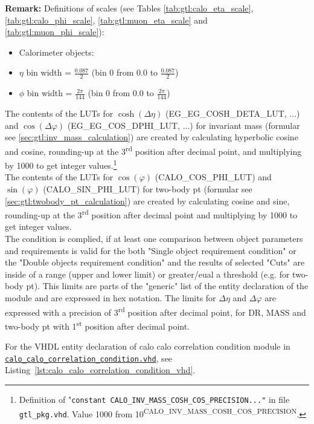 \textbf{Remark:} Definitions of scales (see Tables \ref{tab:gtl:calo_eta_scale}, \ref{tab:gtl:calo_phi_scale}, \ref{tab:gtl:muon_eta_scale} and \ref{tab:gtl:muon_phi_scale}):
\begin{itemize}
\item Calorimeter objects:
\item $\eta$ bin width = $\frac{0.087}{2}$ (bin 0 from 0.0 to $\frac{0.087}{2}$)
\item $\phi$ bin width = $\frac{2\pi}{144}$ (bin 0 from 0.0 to $\frac{2\pi}{144}$)
\end{itemize}

The contents of the LUTs for $\cosh(\Delta\eta)$ (\small{EG\_EG\_COSH\_DETA\_LUT}\normalsize, ...) and $\cos(\Delta\varphi)$ (\small{EG\_EG\_COS\_DPHI\_LUT}\normalsize, ...) for invariant mass (formular see \ref{sec:gtl:inv_mass_calculation}) are created by calculating hyperbolic cosine and cosine, rounding-up at the 3\textsuperscript{rd} position after decimal point, and multiplying by 1000 to get integer values.\footnote{Definition of "\texttt{constant \small{CALO\_INV\_MASS\_COSH\_COS\_PRECISION}\normalsize ..."} in file \texttt{gtl\_pkg.vhd}. Value 1000 from 10\textsuperscript{\tiny{CALO\_INV\_MASS\_COSH\_COS\_PRECISION}}\normalsize.}\\
The contents of the LUTs for $\cos(\varphi)$ (\small{CALO\_COS\_PHI\_LUT}\normalsize) and $\sin(\varphi)$ (\small{CALO\_SIN\_PHI\_LUT}\normalsize) for two-body pt (formular see \ref{sec:gtl:twobody_pt_calculation}) are created by calculating cosine and sine, rounding-up at the 3\textsuperscript{rd} position after decimal point and multiplying by 1000 to get integer values.\\
The condition is complied, if at least one comparison between object parameters and requirements is valid for the both "Single object requirement condition" or the "Double objects requirement condition" and the results of selected "Cuts" are inside of a range (upper and lower limit) or greater/eual a threshold (e.g. for two-body pt).
This limits are parts of the "generic" list of the entity declaration of the module and are expressed in hex notation. The limits for $\Delta\eta$ and $\Delta\varphi$ are expressed with a precision of 3\textsuperscript{rd} position after decimal point, for DR, MASS and two-body pt with 1\textsuperscript{st} position after decimal point.

For the VHDL entity declaration of calo calo correlation condition module in \href{https://github.com/cms-l1-globaltrigger/mp7_ugt_legacy/tree/master/firmware/hdl/gt_mp7_core/gtl_fdl_wrapper/gtl/calo_calo_correlation_condition.vhd}{\texttt{calo\_calo\_correlation\_condition.vhd}}, see Listing~\ref{lst:calo_calo_correlation_condition_vhd}.\\
\clearpage


